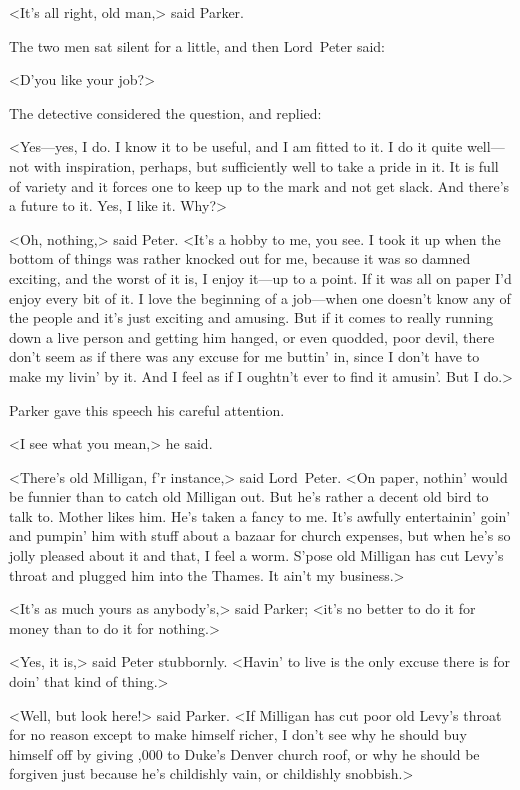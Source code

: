 <It's all right, old man,> said Parker.

The two men sat silent for a little, and then Lord~Peter said:

<D'you like your job?>

The detective considered the question, and replied:

<Yes—yes, I do. I know it to be useful, and I am fitted to it. I do it quite well—not with inspiration, perhaps, but sufficiently well to take a pride in it. It is full of variety and it forces one to keep up to the mark and not get slack. And there's a future to it. Yes, I like it. Why?>

<Oh, nothing,> said Peter. <It's a hobby to me, you see. I took it up when the bottom of things was rather knocked out for me, because it was so damned exciting, and the worst of it is, I enjoy it—up to a point. If it was all on paper I'd enjoy every bit of it. I love the beginning of a job—when one doesn't know any of the people and it's just exciting and amusing. But if it comes to really running down a live person and getting him hanged, or even quodded, poor devil, there don't seem as if there was any excuse for me buttin' in, since I don't have to make my livin' by it. And I feel as if I oughtn't ever to find it amusin'. But I do.>

Parker gave this speech his careful attention.

<I see what you mean,> he said.

<There's old Milligan, f'r instance,> said Lord~Peter. <On paper, nothin' would be funnier than to catch old Milligan out. But he's rather a decent old bird to talk to. Mother likes him. He's taken a fancy to me. It's awfully entertainin' goin' and pumpin' him with stuff about a bazaar for church expenses, but when he's so jolly pleased about it and that, I feel a worm. S'pose old Milligan has cut Levy's throat and plugged him into the Thames. It ain't my business.>

<It's as much yours as anybody's,> said Parker; <it's no better to do it for money than to do it for nothing.>

<Yes, it is,> said Peter stubbornly. <Havin' to live is the only excuse there is for doin' that kind of thing.>

<Well, but look here!> said Parker. <If Milligan has cut poor old Levy's throat for no reason except to make himself richer, I don't see why he should buy himself off by giving ,000 to Duke's Denver church roof, or why he should be forgiven just because he's childishly vain, or childishly snobbish.>

